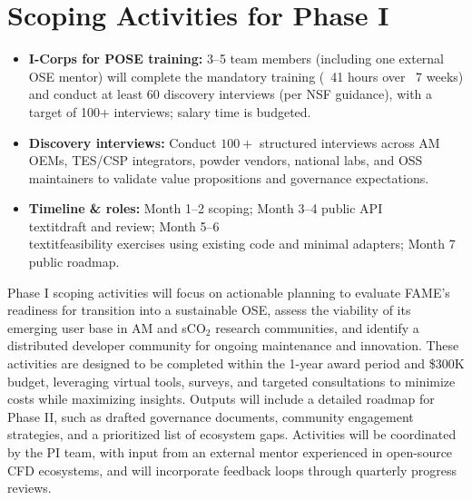 \documentclass[11pt]{article}
\begin{document}
\section*{Scoping Activities for Phase I}
\begin{itemize}[leftmargin=*,nosep]
    \item \textbf{I-Corps for POSE training:} 3--5 team members (including one external OSE mentor) will complete the mandatory training (~41 hours over ~7 weeks) and conduct at least 60 discovery interviews (per NSF guidance), with a target of 100+ interviews; salary time is budgeted.
\item \textbf{Discovery interviews:} Conduct $100{+}$ structured interviews across AM OEMs, TES/CSP integrators, powder vendors, national labs, and OSS maintainers to validate value propositions and governance expectations.
    \item \textbf{Timeline \& roles:} Month 1--2 scoping; Month 3--4 public API \\textit{draft and review}; Month 5--6 \\textit{feasibility exercises using existing code and minimal adapters}; Month 7 public roadmap.
\end{itemize}

\vspace{-3pt}
\noindent
Phase I scoping activities will focus on actionable planning to evaluate FAME's readiness for transition into a sustainable OSE, assess the viability of its emerging user base in AM and sCO$_2$ research communities, and identify a distributed developer community for ongoing maintenance and innovation. These activities are designed to be completed within the 1-year award period and \$300K budget, leveraging virtual tools, surveys, and targeted consultations to minimize costs while maximizing insights. Outputs will include a detailed roadmap for Phase II, such as drafted governance documents, community engagement strategies, and a prioritized list of ecosystem gaps. Activities will be coordinated by the PI team, with input from an external mentor experienced in open-source CFD ecosystems, and will incorporate feedback loops through quarterly progress reviews.
\end{document}
